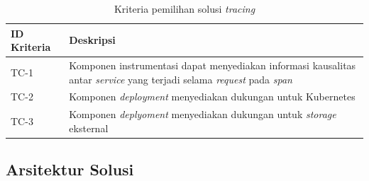 \begin{small}
	\begin{longtable}{ | p{3cm} | p{10cm} |}
		\caption{Kriteria pemilihan solusi \textit{tracing}}
		\label{ch3-trace-crit}                                                           
		\\ \hline
		\centering\bfseries{ID Kriteria} & \centering\bfseries{Deskripsi} \tabularnewline \hline
		\endfirsthead
		TC-1 & Komponen instrumentasi dapat menyediakan informasi kausalitas antar \textit{service} yang terjadi selama \textit{request} pada \textit{span} \\ \hline
		TC-2 & Komponen \textit{deployment} menyediakan dukungan untuk Kubernetes \\ \hline
		TC-3 & Komponen \textit{deplyoment} menyediakan dukungan untuk \textit{storage} eksternal \\ \hline
	\end{longtable}
\end{small}

\subsection{Arsitektur Solusi}

